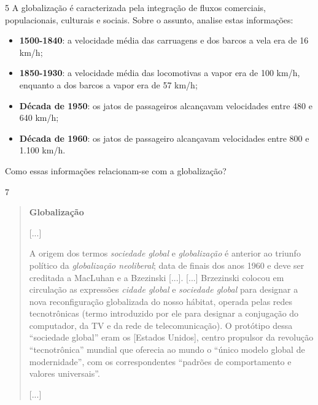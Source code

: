 \num{5} A globalização é caracterizada pela integração de fluxos comerciais,
populacionais, culturais e sociais. Sobre o assunto, analise estas informações:

\begin{itemize}
  \item \textbf{1500-1840}: a velocidade média das carruagens e dos barcos a vela
  era de 16 km/h;
  \item \textbf{1850-1930}: a velocidade média das locomotivas a vapor era de 100 km/h,
  enquanto a dos barcos a vapor era de 57 km/h;
  \item \textbf{Década de 1950}: os jatos de passageiros alcançavam velocidades entre
  480 e 640 km/h;
  \item \textbf{Década de 1960}: os jatos de passageiro alcançavam velocidades entre
  800 e 1.100 km/h.
\end{itemize}

Como essas informações relacionam-se com a globalização?



\num{7}

\begin{quote}
\textbf{Globalização}

{[}...{]}

A origem dos termos \emph{sociedade global}
e \emph{globalização} é anterior ao triunfo político
da \emph{globalização neoliberal}; data
de finais dos anos 1960 e deve ser creditada a MacLuhan e a Bzezinski
{[}...{]}. {[}...{]} Brzezinski colocou em circulação as expressões \emph{cidade global} e
\emph{sociedade global} para designar a nova reconfiguração globalizada do
nosso hábitat, operada pelas redes tecnotrônicas (termo introduzido por
ele para designar a conjugação do computador, da TV e da rede de
telecomunicação). O protótipo dessa ``sociedade global'' eram os [Estados Unidos],
centro propulsor da revolução ``tecnotrônica'' mundial que oferecia ao
mundo o ``único modelo global de modernidade'', com os correspondentes
``padrões de comportamento e valores universais''.

{[}...{]}

\end{quote}

